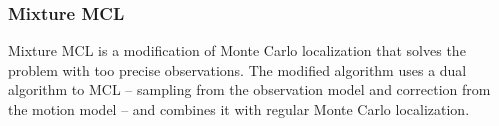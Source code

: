 \subsubsection{Mixture MCL}

Mixture MCL \cite{thrun99} is a modification of Monte Carlo localization that
solves the problem with too precise observations.
The modified algorithm uses a dual algorithm to MCL -- sampling from
the observation model and correction from the motion model -- and combines it with
regular Monte Carlo localization.
